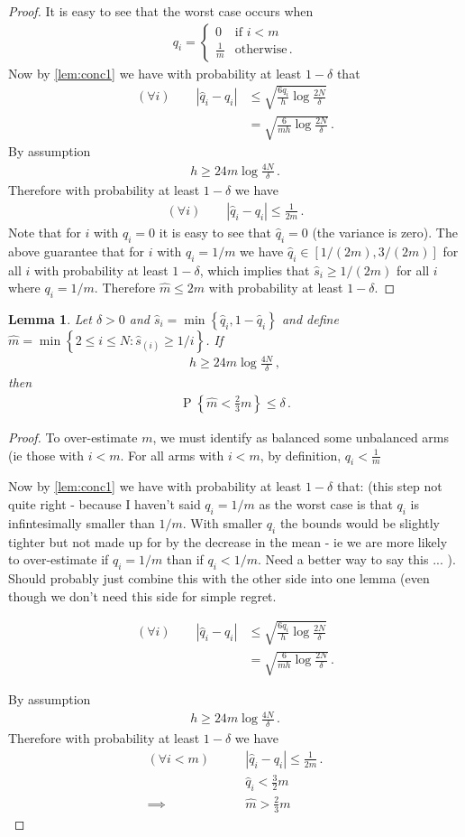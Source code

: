 \documentclass{article}
\newcommand{\set}[1]{\left\{#1\right\}}
\newcommand{\eq}[1]{\begin{align*}#1\end{align*}}
\renewcommand{\P}[1]{\operatorname{P}\left\{#1\right\}}
\theoremstyle{plain}
\newtheorem{lemma}[theorem]{Lemma}
\theoremstyle{definition}
\begin{document}
\begin{proof}
It is easy to see that the worst case occurs when 
\eq{
q_i = \begin{cases}
0 & \text{if } i < m \\
\frac{1}{m} & \text{otherwise}\,.
\end{cases}
}
Now by \cref{lem:conc1} we have with probability at least $1 - \delta$ that 
\eq{
(\forall i) \qquad \left| \hat q_i - q_i\right| 
&\leq \sqrt{\frac{6q_i}{h} \log \frac{2N}{\delta}} \\
&= \sqrt{\frac{6}{mh} \log\frac{2N}{\delta}}\,. 
}
By assumption 
\eq{
h \geq 24m \log \frac{4N}{\delta}\,.
}
Therefore with probability at least $1 - \delta$ we have
\eq{
(\forall i) \qquad \left|\hat q_i - q_i\right| \leq \frac{1}{2m}\,.
}
Note that for $i$ with $q_i = 0$ it is easy to see that $\hat q_i = 0$ (the variance is zero). The above guarantee that
for $i$ with $q_i = 1/m$ we have $\hat q_i \in [1/(2m), 3/(2m)]$ for all $i$ with probability at least $1 - \delta$,
which implies that $\hat s_i \geq 1/(2m)$ for all $i$ where $q_i = 1/m$.
Therefore $\hat m \leq 2m$ with probability at least $1 - \delta$. 
\end{proof}

\begin{lemma}\label{lem:m_est_small_enough}
Let $\delta >0$ and $\hat s_i = \min\set{\hat q_i, 1 - \hat q_i}$ and
define $\hat m = \min\set{2 \leq i \leq N : \hat s_{(i)} \geq 1/i}$.
If
\eq{
h \geq 24m \log\frac{4N}{\delta}\,,
}
then
\eq{
\P{\hat m < \frac{2}{3}m} \leq \delta\,.
}
\end{lemma}

\begin{proof}

To over-estimate $m$, we must identify as balanced some unbalanced arms (ie those with $i < m$. For all arms with $i < m$, by definition, $q_i < \frac{1}{m}$


Now by \cref{lem:conc1} we have with probability at least $1 - \delta$ that: \color{red}(this step not quite right - because I haven't said $q_i = 1/m$ as the worst case is that $q_i$ is infintesimally smaller than $1/m$. With smaller $q_i$ the bounds would be slightly tighter but not made up for by the decrease in the mean - ie we are more likely to over-estimate if $q_i = 1/m$ than if $q_i < 1/m$. Need a better way to say this ... ). Should probably just combine this with the other side into one lemma (even though we don't need this side for simple regret. \color{black}


\eq{
(\forall i) \qquad \left| \hat q_i - q_i\right| 
&\leq \sqrt{\frac{6q_i}{h} \log \frac{2N}{\delta}} \\
&= \sqrt{\frac{6}{mh} \log\frac{2N}{\delta}}\,. 
}



By assumption 
\eq{
h \geq 24m \log \frac{4N}{\delta}\,.
}
Therefore with probability at least $1 - \delta$ we have
\eq{
(\forall i < m) \qquad & \left|\hat q_i - q_i\right| \leq \frac{1}{2m}\,.\\
 & \hat{q}_i < \frac{3}{2}m \\
 \implies & \hat{m} > \frac{2}{3}m
}
 
\end{proof}
\end{document}

